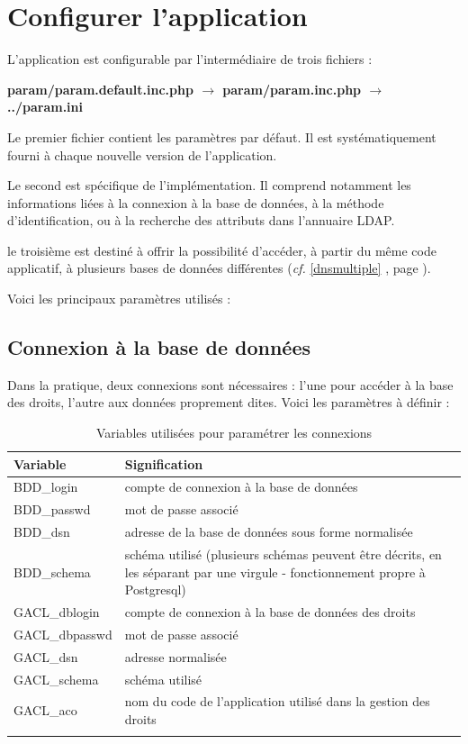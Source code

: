 \section{Configurer l'application}

L'application est configurable par l'intermédiaire de trois fichiers :

\textbf{param/param.default.inc.php $\rightarrow$ param/param.inc.php $\rightarrow$ ../param.ini}

Le premier fichier contient les paramètres par défaut. Il est systématiquement fourni à chaque nouvelle version de l'application.

Le second est spécifique de l'implémentation. Il comprend notamment les informations liées à la connexion à la base de données, à la méthode d'identification, ou à la recherche des attributs dans l'annuaire LDAP. 

le troisième est destiné à offrir la possibilité d'accéder, à partir du même code applicatif, à plusieurs bases de données différentes (\textit{cf.} \ref{dnsmultiple} \textit{}, page \pageref{dnsmultiple}).

Voici les principaux paramètres utilisés :

\subsection{Connexion à la base de données}

Dans la pratique, deux connexions sont nécessaires : l'une pour accéder à la base des droits, l'autre aux données proprement dites. Voici les paramètres à définir :

\begin{longtable}{|p{4cm}|p{11cm}|}
\hline
\textbf{Variable} & \textbf{Signification} \\
\hline
\endhead
BDD\_login & compte de connexion à la base de données \\
\hline
BDD\_passwd & mot de passe associé\\
\hline
BDD\_dsn & adresse de la base de données sous forme normalisée\\
\hline
BDD\_schema & schéma utilisé (plusieurs schémas peuvent être décrits, en les séparant par une virgule - fonctionnement propre à Postgresql)\\
\hline
GACL\_dblogin & compte de connexion à la base de données des droits\\
\hline
GACL\_dbpasswd & mot de passe associé\\
\hline
GACL\_dsn & adresse normalisée \\
\hline
GACL\_schema & schéma utilisé\\
\hline
GACL\_aco & nom du code de l'application utilisé dans la gestion des droits\\
\hline
\caption{Variables utilisées pour paramétrer les connexions}
\end{longtable}


